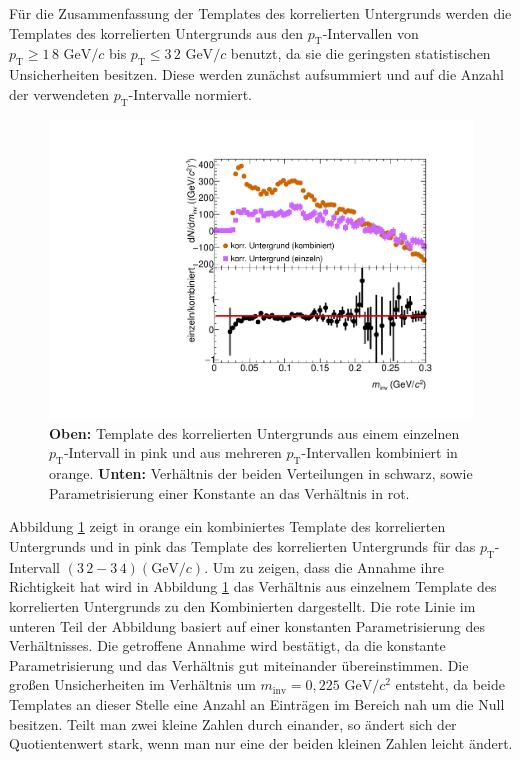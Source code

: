 Für die Zusammenfassung der Templates des korrelierten Untergrunds werden die Templates des korrelierten Untergrunds aus den $p_\text{T}$-Intervallen von $p_\text{T} \geq 1\,8\text{ GeV}/c$ bis $p_\text{T} \leq 3\,2\text{ GeV}/c$ benutzt, da sie die geringsten statistischen Unsicherheiten besitzen.
Diese werden zunächst aufsummiert und auf die Anzahl der verwendeten $p_\text{T}$-Intervalle normiert.
\begin{figure}[t!]
\centering
\includegraphics[width=.7\linewidth]{BackgroundWithRatio10_Data_2016.pdf}
\caption{\textbf{Oben:} Template des korrelierten Untergrunds aus einem einzelnen $p_\text{T}$-Intervall in pink und aus mehreren $p_\text{T}$-Intervallen kombiniert in orange.
\textbf{Unten:} Verhältnis der beiden Verteilungen in schwarz, sowie Parametrisierung einer Konstante an das Verhältnis in rot.}
\label{fig:BkgTempRatio}
\end{figure}
\newline
Abbildung \ref{fig:BkgTempRatio} zeigt in orange ein kombiniertes Template des korrelierten Untergrunds und in pink das Template des korrelierten Untergrunds für das $p_\text{T}$-Intervall $(3\,2 - 3\,4) (\text{GeV/}c)$.
Um zu zeigen, dass die Annahme ihre Richtigkeit hat wird in Abbildung \ref{fig:BkgTempRatio} das Verhältnis aus einzelnem Template des korrelierten Untergrunds zu den Kombinierten dargestellt.
Die rote Linie im unteren Teil der Abbildung basiert auf einer konstanten Parametrisierung des Verhältnisses.
Die getroffene Annahme wird bestätigt, da die konstante Parametrisierung und das Verhältnis gut miteinander übereinstimmen.
Die großen Unsicherheiten im Verhältnis um $m_\text{inv} = 0,225\text{ GeV}/c^{2}$ entsteht, da beide Templates an dieser Stelle eine Anzahl an Einträgen im Bereich nah um die Null besitzen.
Teilt man zwei kleine Zahlen durch einander, so ändert sich der Quotientenwert stark, wenn man nur eine der beiden kleinen Zahlen leicht ändert.
